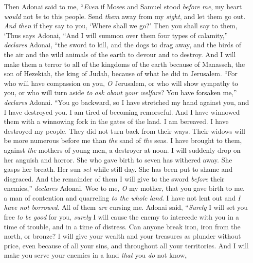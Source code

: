 \begin{biblechapter} %
 Then Adonai said to me, “\textit{Even} if Moses and Samuel stood \textit{before me}, my heart \textit{would} not \textit{be} to this people. Send \textit{them} away from my \textit{sight}, and let them go out.
\verse \textit{And then} if they say to you, ‘Where shall we go?’ Then you shall say to them, ‘Thus says Adonai,
\verse “And I will summon over them four types of calamity,” \textit{declares} Adonai, “the sword to kill, and the dogs to drag away, and the birds of the air and the wild animals of the earth to devour and to destroy.
\verse And I will make them a terror to all of the kingdoms of the earth because of Manasseh, the son of Hezekiah, the king of Judah, because of what he did in Jerusalem.
\verse “For who will have compassion on you, \textit{O} Jerusalem, 
or who will show sympathy to you, 
or who will turn aside \textit{to ask about your welfare}?
\verse You have forsaken me,” \textit{declares} Adonai. 
“You go backward, so I have stretched my hand against you, 
and I have destroyed you. 
I am tired of becoming remorseful.
\verse And I have winnowed them with a winnowing fork in the gates of the land. 
I am bereaved. 
I have destroyed my people. 
They did not turn back from their ways.
\verse Their widows will be more numerous before me than \textit{the} sand of \textit{the} seas. 
I have brought to them, against \textit{the} mothers of young men, 
a destroyer at noon. 
I will suddenly drop on her anguish and horror.
\verse She who gave birth to seven has withered away. 
She gasps her breath. 
Her sun \textit{set} while still day. 
She has been put to shame and disgraced. 
And the remainder of them I will give to the sword 
\textit{before} their enemies,” \textit{declares} Adonai.
 Woe to me, \textit{O} my mother, that you gave birth to me, 
a man of contention and quarreling \textit{to the whole land}. 
I have not lent out and \textit{I have not borrowed}. 
All of them \textit{are} cursing me.
\verse Adonai said,
\verse “\textit{Surely} I will set you free \textit{to be good} for you, 
\textit{surely} I will cause the enemy to intercede with you 
in a time of trouble, 
and in a time of distress.
\verse Can anyone break iron, 
iron from the north, or bronze?
\verse I will give your wealth and your treasures 
as plunder without price, 
even because of all your sins, 
and throughout all your territories.
\verse And I will make you serve your enemies 
in a land \textit{that} you \textit{do} not know, 

\end{biblechapter}
